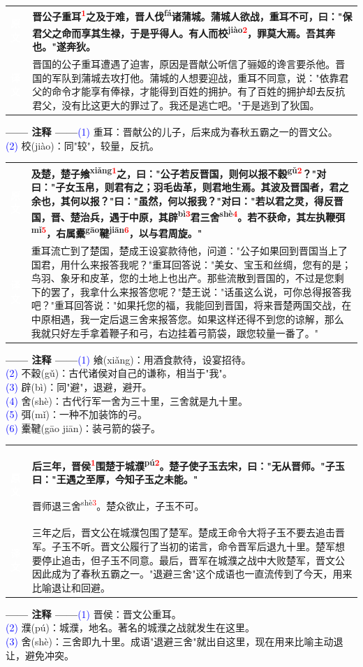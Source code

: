 \documentclass[a4paper,12pt]{ctexart}
\makeatletter
\newcommand{\ruby}[2]{#1\textsuperscript{#2}}
\newlength{\colA}\setlength{\colA}{0.06\textwidth}
\newlength{\colB}\setlength{\colB}{0.64\textwidth}
\newlength{\colC}\setlength{\colC}{0.26\textwidth}
\newcommand{\sectab}[3]{%
  \noindent
  \begin{minipage}[c]{\dimexpr\colA+\colB+2\tabcolsep\relax}
  \begin{tabular}{@{}p{\colA}p{\colB}@{}}
  \sideyuan  & {\large\bfseries #1} \\
  \sideyiwen & {\large #2} \\
  \end{tabular}
  \end{minipage}
  \hfill
  \begin{minipage}[c]{\colC}
  {\labelann\vspace{0.1cm}}#3
  \end{minipage}
  \par
}
\newcommand{\sideyuan}{\colorbox{blue!70!black}{\textcolor{white}{\normalsize\textbf{原文}}}}
\newcommand{\sideyiwen}{\colorbox{green!60!black}{\textcolor{white}{\normalsize\textbf{译文}}}}
\newcommand{\labelann}{\textcolor{orange!80!black}{\small\textbf{—— 注释 ——}}}
\newcommand{\refmark}[1]{\textsuperscript{\textcolor{red}{#1}}}
\makeatother
\begin{document}
\vspace{0.3cm}
\sectab{晋公子重耳\refmark{1}之及于难，晋人\ruby{伐}{fá}诸蒲城。蒲城人欲战，重耳不可，曰："保君父之命而享其生禄，于是乎得人。有人而\ruby{校}{jiào}\refmark{2}，罪莫大焉。吾其奔也。"遂奔狄。}{晋国的公子重耳遭遇了迫害，原因是晋献公听信了骊姬的谗言要杀他。晋国的军队到蒲城去攻打他。蒲城的人想要迎战，重耳不同意，说："依靠君父的命令才能享有俸禄，才能得到百姓的拥护。有了百姓的拥护却去反抗君父，没有比这更大的罪过了。我还是逃亡吧。"于是逃到了狄国。}{{\small \textcolor{blue}{(1)} 重耳：晋献公的儿子，后来成为春秋五霸之一的晋文公。}\\[0.1cm]{\small \textcolor{blue}{(2)} 校(jiào)：同"较"，较量，反抗。}}

\vspace{0.3cm}
\sectab{及楚，楚子\ruby{飨}{xiǎng}\refmark{1}之，曰："公子若反晋国，则何以报不\ruby{穀}{gǔ}\refmark{2}？"对曰："子女玉帛，则君有之；羽毛齿革，则君地生焉。其波及晋国者，君之余也，其何以报？"曰："虽然，何以报我？"对曰："若以君之灵，得反晋国，晋、楚治兵，遇于中原，其\ruby{辟}{bì}\refmark{3}君三\ruby{舍}{shè}\refmark{4}。若不获命，其左执鞭\ruby{弭}{mǐ}\refmark{5}，右属\ruby{櫜}{gāo}\ruby{鞬}{jiān}\refmark{6}，以与君周旋。"}{重耳流亡到了楚国，楚成王设宴款待他，问道："公子如果回到晋国当上了国君，用什么来报答我呢？"重耳回答说："美女、宝玉和丝绸，您有的是；鸟羽、象牙和皮革，您的土地上也出产。那些流散到晋国的，不过是您剩下的罢了，我拿什么来报答您呢？"楚王说："话虽这么说，可你总得报答我吧？"重耳回答说："如果托您的福，我能回到晋国，将来晋楚两国交战，在中原相遇，我一定后退三舍来报答您。如果这样还得不到您的谅解，那么我就只好左手拿着鞭子和弓，右边挂着弓箭袋，跟您较量一番了。"}{{\small \textcolor{blue}{(1)} 飨(xiǎng)：用酒食款待，设宴招待。}\\[0.1cm]{\small \textcolor{blue}{(2)} 不穀(gǔ)：古代诸侯对自己的谦称，相当于"我"。}\\[0.1cm]{\small \textcolor{blue}{(3)} 辟(bì)：同"避"，退避，避开。}\\[0.1cm]{\small \textcolor{blue}{(4)} 舍(shè)：古代行军一舍为三十里，三舍就是九十里。}\\[0.1cm]{\small \textcolor{blue}{(5)} 弭(mǐ)：一种不加装饰的弓。}\\[0.1cm]{\small \textcolor{blue}{(6)} 櫜鞬(gāo jiān)：装弓箭的袋子。}}

\sectab{后三年，晋侯\refmark{1}围楚于城\ruby{濮}{pú}\refmark{2}。楚子使子玉去宋，曰："无从晋师。"子玉曰："王遇之至厚，今知子玉之未能。"\par
晋师退三\ruby{舍}{shè}\refmark{3}。楚众欲止，子玉不可。}{三年之后，晋文公在城濮包围了楚军。楚成王命令大将子玉不要去追击晋军。子玉不听。晋文公履行了当初的诺言，命令晋军后退九十里。楚军想要停止追击，但子玉不同意。最后，晋军在城濮之战中大败楚军，晋文公因此成为了春秋五霸之一。"退避三舍"这个成语也一直流传到了今天，用来比喻退让和回避。}{{\small \textcolor{blue}{(1)} 晋侯：晋文公重耳。}\\[0.1cm]{\small \textcolor{blue}{(2)} 濮(pú)：城濮，地名。著名的城濮之战就发生在这里。}\\[0.1cm]{\small \textcolor{blue}{(3)} 舍(shè)：三舍即九十里。成语"退避三舍"就出自这里，现在用来比喻主动退让，避免冲突。}}
\end{document}
